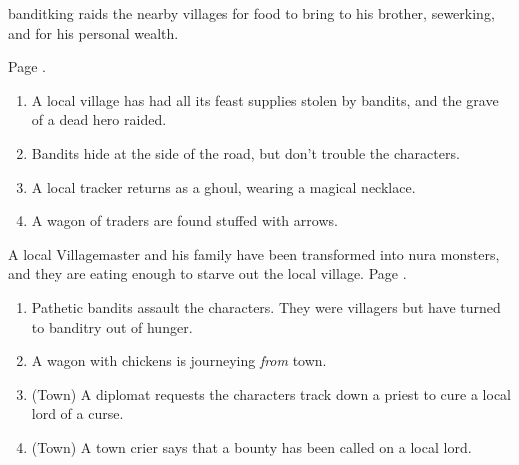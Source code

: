 \begin{multicols}{2}
\Gls{banditking} raids the nearby villages for food to bring to his brother, \gls{sewerking}, and for his personal wealth.

Page \pageref{immortalbandits}.

\begin{enumerate}

	\item{A local village has had all its feast supplies stolen by bandits, and the grave of a dead hero raided.}
	\item{Bandits hide at the side of the road, but don't trouble the characters.}
	\item{A local tracker returns as a ghoul, wearing a magical necklace.}
	\item{A wagon of traders are found stuffed with arrows.}
\end{enumerate}


A local Villagemaster and his family have been transformed into nura monsters, and they are eating enough to starve out the local village.
Page \pageref{desperatemeasures}.

\begin{enumerate}

	\item{ Pathetic bandits assault the characters.  They were villagers but have turned to banditry out of hunger.}
	\item{A wagon with chickens is journeying \emph{from} town.}
	\item{ (Town) A diplomat requests the characters track down a priest to cure a local lord of a curse.}
	\item{ (Town) A town crier says that a bounty has been called on a local lord.}

\end{enumerate}



\end{multicols}
